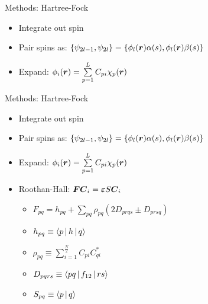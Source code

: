 \documentclass[10pt, t, xcolor=dvipsnames]{beamer}
\begin{document}
\begin{frame}[fragile]{Methods: Hartree-Fock}
    \begin{itemize}
        \item Integrate out spin
        \item Pair spins as: $\{\psi_{2l-1}, \psi_{2l}\} =
            \{\phi_l(\bm{{r}})\alpha(s),\phi_l(\bm{{r}})\beta(s)\}$
        \item Expand: $\phi_i(\bm{{r}}) = \sum\limits^L_{p=1} C_{pi}\chi_p(\bm{{r}})$
    \end{itemize}
\end{frame}

\begin{frame}[fragile]{Methods: Hartree-Fock}
    \begin{itemize}
        \item Integrate out spin
        \item Pair spins as: $\{\psi_{2l-1}, \psi_{2l}\} =
            \{\phi_l(\bm{{r}})\alpha(s),\phi_l(\bm{{r}})\beta(s)\}$
        \item Expand: $\phi_i(\bm{{r}}) = \sum\limits^L_{p=1} C_{pi}\chi_p(\bm{{r}})$
        \item Roothan-Hall: $\bm{{F}}\bm{{C}}_i = \bm{{\varepsilon}}S\bm{{C}}_i$
            \begin{itemize}
                \item $F_{pq} = h_{pq} + \sum\limits_{pq}\rho_{pq}\left(2D_{prqs} \pm D_{prsq}\right)$
                \vsp
                \item $h_{pq} \equiv \Braket{p | h | q}$
                \vsp
                \item $\rho_{pq} \equiv \sum\limits^{\frac{N}{2}}_{i=1} C_{pi}C^{*}_{qi}$
                \vsp
                \item $D_{pqrs} \equiv \Braket{pq | f_{12} | rs}$
                \item $S_{pq} \equiv \Braket{p | q}$
            \end{itemize}
    \end{itemize}
\end{frame}
\end{document}
